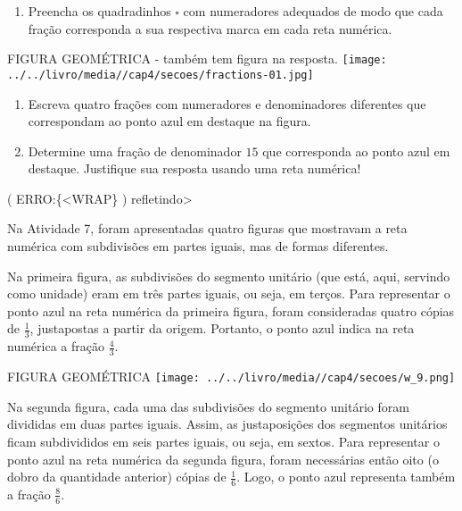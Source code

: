 \documentclass[a4,12pt]{book}
\begin{document}
\begin{enumerate} [\quad I)] %
  \item     Preencha os quadradinhos     $\square$     com numeradores adequados de modo que cada fração corresponda a sua respectiva marca em cada reta numérica.    \mbox{} \newline      
\end{enumerate} %
\begin{imagem*}[breakable]{}{}   FIGURA GEOMÉTRICA - também tem figura na resposta.  \mbox{} \newline        \texttt{[image: ../../livro/media//cap4/secoes/fractions-01.jpg]}   \end{imagem*}
\begin{enumerate} [\quad I)] %
  \item     Escreva quatro frações com numeradores e denominadores diferentes que correspondam ao ponto azul em destaque na figura.
  \item     Determine uma fração de denominador     $15$     que corresponda ao ponto azul em destaque. Justifique sua resposta usando uma reta numérica!
\end{enumerate} %









( ERRO:\{<WRAP\} ) refletindo>

Na Atividade 7, foram apresentadas quatro figuras que mostravam a reta numérica com subdivisões em partes iguais, mas de formas diferentes.

Na primeira figura, as subdivisões do segmento unitário (que está, aqui, servindo como unidade) eram em três partes iguais, ou seja, em terços. Para representar o ponto azul na reta numérica da primeira figura, foram consideradas quatro cópias de $\frac{1}{3}$, justapostas a partir da origem. Portanto, o ponto azul indica na reta numérica a fração $\frac{4}{3}$.

\begin{imagem*}[breakable]{}{}   FIGURA GEOMÉTRICA  
    \texttt{[image: ../../livro/media//cap4/secoes/w\_9.png]}  
\end{imagem*}

Na segunda figura, cada uma das subdivisões do segmento unitário foram divididas em duas partes iguais. Assim, as justaposições dos segmentos unitários ficam subdivididos em seis partes iguais, ou seja, em sextos. Para representar o ponto azul na reta numérica da segunda figura, foram necessárias então oito (o dobro da quantidade anterior) cópias de  $\frac{1}{6}$. Logo, o ponto azul representa também a fração $\frac{8}{6}$.
\end{document}
